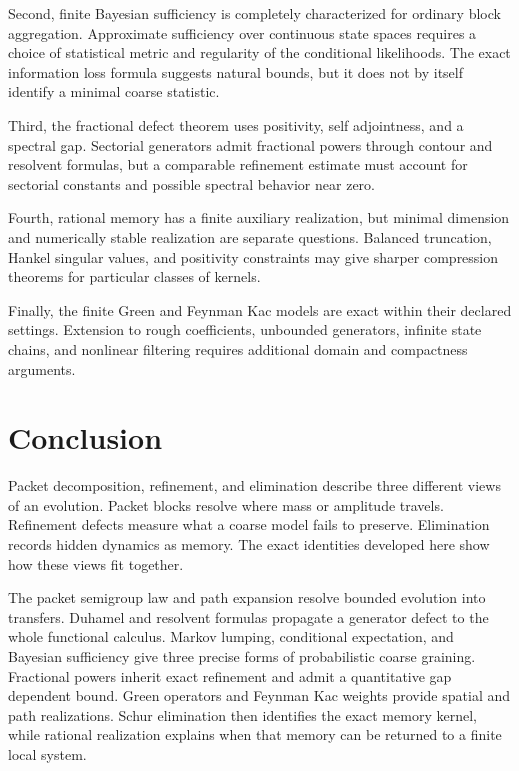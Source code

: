 \documentclass{aomart}
\theoremstyle{definition}
\theoremstyle{remark}
\begin{document}
Second, finite Bayesian sufficiency is completely characterized for ordinary block aggregation. Approximate sufficiency over continuous state spaces requires a choice of statistical metric and regularity of the conditional likelihoods. The exact information loss formula suggests natural bounds, but it does not by itself identify a minimal coarse statistic.

Third, the fractional defect theorem uses positivity, self adjointness, and a spectral gap. Sectorial generators admit fractional powers through contour and resolvent formulas, but a comparable refinement estimate must account for sectorial constants and possible spectral behavior near zero.

Fourth, rational memory has a finite auxiliary realization, but minimal dimension and numerically stable realization are separate questions. Balanced truncation, Hankel singular values, and positivity constraints may give sharper compression theorems for particular classes of kernels.

Finally, the finite Green and Feynman Kac models are exact within their declared settings. Extension to rough coefficients, unbounded generators, infinite state chains, and nonlinear filtering requires additional domain and compactness arguments.

\section{Conclusion}\label{sec:conclusion}

Packet decomposition, refinement, and elimination describe three different views of an evolution. Packet blocks resolve where mass or amplitude travels. Refinement defects measure what a coarse model fails to preserve. Elimination records hidden dynamics as memory. The exact identities developed here show how these views fit together.

The packet semigroup law and path expansion resolve bounded evolution into transfers. Duhamel and resolvent formulas propagate a generator defect to the whole functional calculus. Markov lumping, conditional expectation, and Bayesian sufficiency give three precise forms of probabilistic coarse graining. Fractional powers inherit exact refinement and admit a quantitative gap dependent bound. Green operators and Feynman Kac weights provide spatial and path realizations. Schur elimination then identifies the exact memory kernel, while rational realization explains when that memory can be returned to a finite local system.




\end{document}

